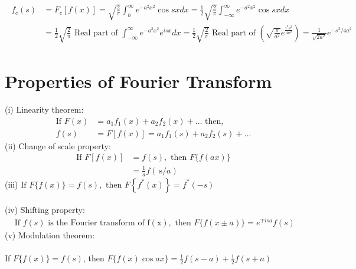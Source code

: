 \begin{answer}
	\begin{align*}
	\begin{aligned}
	f_{c}(s) &=F_{c}[f(x)]=\sqrt{\frac{2}{\pi}} \int_{b}^{\infty} e^{-a^{2} x^{2}} \cos s x d x=\frac{1}{2} \sqrt{\frac{2}{\pi}} \int_{-\infty}^{\infty} e^{-a^{2} x^{2}} \cos s x d x \\
	&=\frac{1}{2} \sqrt{\frac{2}{\pi}} \text { Real part of } \int_{-\infty}^{\infty} e^{-a^{2} x^{2}} e^{i s x} d x=\frac{1}{2} \sqrt{\frac{2}{\pi}} \text { Real part of }\left(\sqrt{\frac{\pi}{a^{2}}} e^{\frac{i^{2} s^{2}}{4 a^{2}}}\right)=\frac{1}{\sqrt{2 a^{2}}} e^{-s^{2} / 4 a^{2}}
	\end{aligned}
	\end{align*}
\end{answer}
\section{Properties of Fourier Transform}
(i) Linearity theorem: 
\begin{align*}
\text{If }F(x)&=a_{1} f_{1}(x)+a_{2} f_{2}(x)+\ldots\text{ then, }\\f(s)&=F[f(x)]=a_{1} f_{1}(s)+a_{2} f_{2}(s)+\ldots
\end{align*}
(ii) Change of scale property: 
\begin{align*}
\text{If }F[f(x)]&=f(s),\text{ then }F\{f(a x)\}\\&=\frac{1}{a} f(\mathrm{~s} / a)
\end{align*}
(iii) $\text{If }F\{f(x)\}=f(s),\text{ then }F\left\{f^{*}(x)\right\}=f^{*}(-s)$\\\\
(iv) Shifting property:
 \begin{align*}
\text{ If $f(s)$ is the Fourier transform of }\mathrm{f}(\mathrm{x}), \text{ then }F\{f(x \pm a)\}=e^{\mp i s a} f(s)
 \end{align*}
(v) Modulation theorem: \\\\
If $F\{f(x)\}=f(s)$, then $F\{f(x) \cos a x\}=\frac{1}{2} f(s-a)+\frac{1}{2} f(s+a)$

